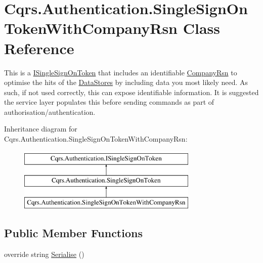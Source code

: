 \hypertarget{classCqrs_1_1Authentication_1_1SingleSignOnTokenWithCompanyRsn}{}\section{Cqrs.\+Authentication.\+Single\+Sign\+On\+Token\+With\+Company\+Rsn Class Reference}
\label{classCqrs_1_1Authentication_1_1SingleSignOnTokenWithCompanyRsn}


This is a \hyperlink{interfaceCqrs_1_1Authentication_1_1ISingleSignOnToken}{I\+Single\+Sign\+On\+Token} that includes an identifiable \hyperlink{classCqrs_1_1Authentication_1_1SingleSignOnTokenWithCompanyRsn_abb327084c1ff87de84c92008b4437675_abb327084c1ff87de84c92008b4437675}{Company\+Rsn} to optimise the hits of the \hyperlink{}{Data\+Stores} by including data you most likely need. As such, if not used correctly, this can expose identifiable information. It is suggested the service layer populates this before sending commands as part of authorisation/authentication.  


Inheritance diagram for Cqrs.\+Authentication.\+Single\+Sign\+On\+Token\+With\+Company\+Rsn\+:\begin{figure}[H]
\begin{center}
\leavevmode
\includegraphics[height=3.000000cm]{classCqrs_1_1Authentication_1_1SingleSignOnTokenWithCompanyRsn}
\end{center}
\end{figure}
\subsection*{Public Member Functions}
\begin{DoxyCompactItemize}
\item 
override string \hyperlink{classCqrs_1_1Authentication_1_1SingleSignOnTokenWithCompanyRsn_a0bc9f0fae90121d029fe0730708f4210_a0bc9f0fae90121d029fe0730708f4210}{Serialise} ()
\end{DoxyCompactItemize}

